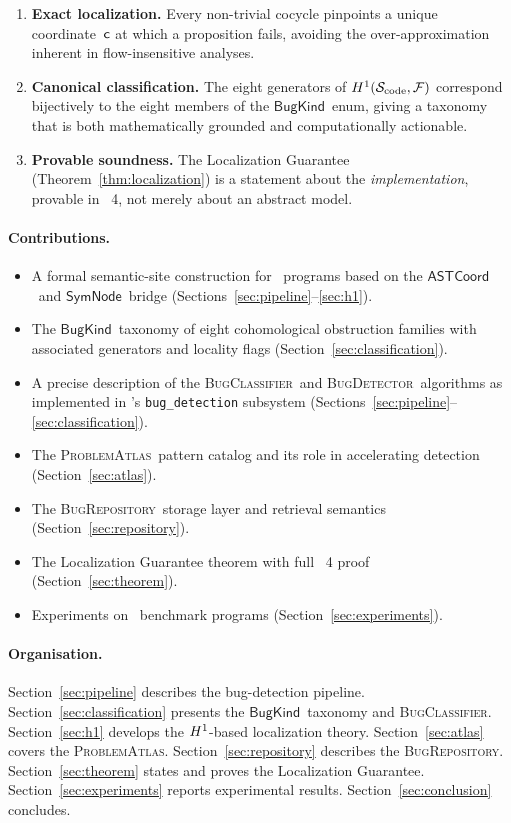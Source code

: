 \documentclass[11pt]{article}
\newcommand{\BugKind}{\ensuremath{\mathsf{BugKind}}}          %
\newcommand{\BugDet}{\textsc{BugDetector}}        %
\newcommand{\BugClass}{\textsc{BugClassifier}}    %
\newcommand{\BugRepo}{\textsc{BugRepository}}     %
\newcommand{\ProbAtlas}{\textsc{ProblemAtlas}}    %
\newcommand{\SemSite}{\mathcal{S}_{\mathrm{code}}}%
\newcommand{\ASTCoord}{\ensuremath{\mathsf{ASTCoord}}}         %
\newcommand{\SymNode}{\ensuremath{\mathsf{SymNode}}}           %
\begin{document}
\begin{enumerate}[leftmargin=2em,label=(\roman*)]
\item \textbf{Exact localization.}  Every non-trivial cocycle pinpoints a
  unique coordinate~$\mathsf{c}$ at which a proposition fails, avoiding the
  over-approximation inherent in flow-insensitive analyses.
\item \textbf{Canonical classification.}  The eight generators of
  $\Hcoh{1}(\SemSite,\mathcal{F})$ correspond bijectively to the eight
  members of the \BugKind\ enum, giving a taxonomy that is both
  mathematically grounded and computationally actionable.
\item \textbf{Provable soundness.}  The Localization Guarantee
  (Theorem~\ref{thm:localization}) is a statement about the
  \emph{implementation}, provable in \LEAN~4, not merely about
  an abstract model.
\end{enumerate}

\paragraph{Contributions.}
\begin{itemize}[leftmargin=2em]
  \item A formal semantic-site construction for \Python\ programs based on
    the \ASTCoord\ and \SymNode\ bridge
    (Sections~\ref{sec:pipeline}--\ref{sec:h1}).
  \item The \BugKind\ taxonomy of eight cohomological obstruction families
    with associated generators and locality flags
    (Section~\ref{sec:classification}).
  \item A precise description of the \BugClass\ and \BugDet\ algorithms as
    implemented in \JuGeo's \texttt{bug\_detection} subsystem
    (Sections~\ref{sec:pipeline}--\ref{sec:classification}).
  \item The \ProbAtlas\ pattern catalog and its role in accelerating
    detection (Section~\ref{sec:atlas}).
  \item The \BugRepo\ storage layer and retrieval semantics
    (Section~\ref{sec:repository}).
  \item The Localization Guarantee theorem with full \LEAN~4 proof
    (Section~\ref{sec:theorem}).
  \item Experiments on \numbug\ benchmark programs
    (Section~\ref{sec:experiments}).
\end{itemize}

\paragraph{Organisation.}
Section~\ref{sec:pipeline} describes the bug-detection pipeline.
Section~\ref{sec:classification} presents the \BugKind\ taxonomy and
\BugClass.  Section~\ref{sec:h1} develops the $H^{1}$-based
localization theory.  Section~\ref{sec:atlas} covers the \ProbAtlas.
Section~\ref{sec:repository} describes the \BugRepo.
Section~\ref{sec:theorem} states and proves the Localization Guarantee.
Section~\ref{sec:experiments} reports experimental results.
Section~\ref{sec:conclusion} concludes.
\end{document}

